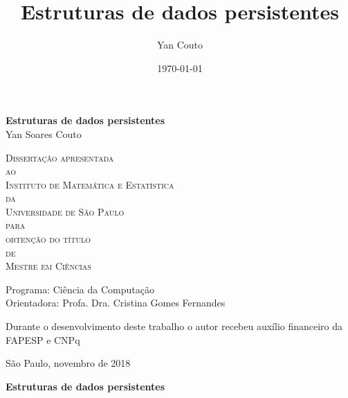 \documentclass[11pt,oneside,a4paper, openany]{book}
\title{Estruturas de dados persistentes}
\author{Yan Couto}
\date{\today}
\begin{document}
\frontmatter

\thispagestyle{empty}
\begin{center}
    \vspace*{2.3cm}
    \textbf{\Large{Estruturas de dados persistentes}}\\

    \vspace*{1.2cm}
    \Large{Yan Soares Couto}

    \vskip 2cm
    \textsc{
    Dissertação apresentada\\[-0.25cm] 
    ao\\[-0.25cm]
    Instituto de Matemática e Estatística\\[-0.25cm]
    da\\[-0.25cm]
    Universidade de São Paulo\\[-0.25cm]
    para\\[-0.25cm]
    obtenção do título\\[-0.25cm]
    de\\[-0.25cm]
    Mestre em Ciências}

    \vskip 1.5cm
    Programa: Ciência da Computação\\
    Orientadora: Profa. Dra. Cristina Gomes Fernandes

    \vskip 1cm
    \normalsize{Durante o desenvolvimento deste trabalho o autor recebeu auxílio
    financeiro da FAPESP e CNPq}

    \vskip 0.5cm
    \normalsize{São Paulo, novembro de 2018}
\end{center}

%
%
%
\newpage
\thispagestyle{empty}
    \begin{center}
        \vspace*{2.3 cm}
        \textbf{\Large{Estruturas de dados persistentes}}\\
        \vspace*{2 cm}
    \end{center}
\end{document}
